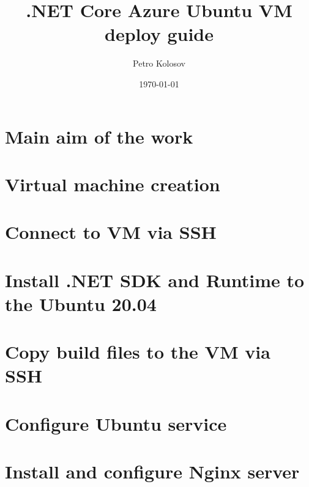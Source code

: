 \documentclass[12pt,letterpaper,oneside,reqno]{amsart}
\title[.NET Core Azure Ubuntu VM deploy guide]
{.NET Core Azure Ubuntu VM deploy guide}
\author[Petro Kolosov]{Petro Kolosov}
\date{\today}
\numberwithin{equation}{section}
\begin{document}
    \begin{abstract}
        
    \end{abstract}

    \maketitle

    \tableofcontents


    \section{Main aim of the work}\label{sec:main-aim-of-the-work}
    


    \section{Virtual machine creation}\label{sec:virtual-machine-creation}
    


    \section{Connect to VM via SSH}\label{sec:connect-to-vm-via-ssh}
    


    \section{Install .NET SDK and Runtime to the Ubuntu 20.04}\label{sec:install-.net-sdk-to-ubuntu-20.04}
    


    \section{Copy build files to the VM via SSH}\label{sec:copy-build-files-to-the-vm-via-ssh}
    


    \section{Configure Ubuntu service}\label{sec:configure-ubuntu-service}
    


    \section{Install and configure Nginx server}\label{sec:install-and-configure-nginx-server}
    
\end{document}
